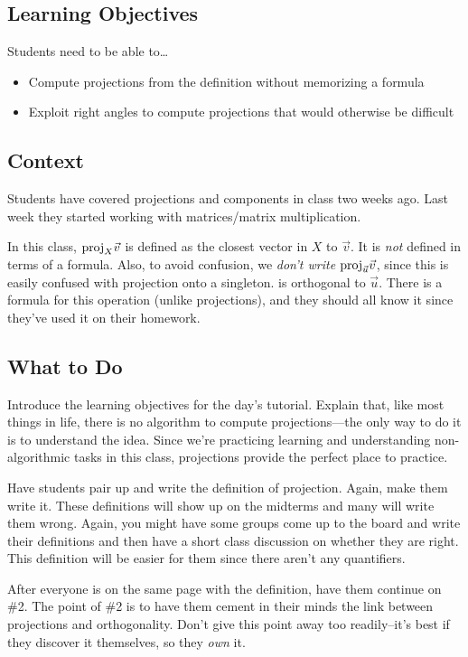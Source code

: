 \subsection*{Learning Objectives}
	Students need to be able to\ldots
	\begin{itemize}
		\item Compute projections from the definition without memorizing a formula
		\item Exploit right angles to compute projections that would otherwise be
			difficult
	\end{itemize}

\subsection*{Context}
	Students have covered projections and components in class two weeks ago. Last week they started
		working with matrices/matrix multiplication.

	In this class, $\mathrm{proj}_X\vec v$ is defined as the closest vector in $X$ to $\vec v$. It is \emph{not}
		defined in terms of a formula. Also, to avoid confusion, we \emph{don't write}
		$\mathrm{proj}_{\vec u}\vec v$, since this is easily confused with projection onto a singleton.
		is orthogonal to $\vec u$. There is a formula for this operation (unlike projections), and they
		should all know it since they've used it on their homework.

\subsection*{What to Do}
	Introduce the learning objectives for the day's tutorial. Explain that, like most things in life,
		there is no algorithm to compute projections---the only way to do it is to understand
		the idea. Since we're practicing learning and understanding non-algorithmic tasks in this
		class, projections provide the perfect place to practice.

	Have students pair up and write the definition of projection. Again, make them
		write it. These definitions will show up on the midterms and many will
		write them wrong. Again, you might have some groups come up to the board and
		write their definitions and then have a short class discussion on whether they are right.
		This definition will be easier for them since there aren't any quantifiers.

		After everyone is on the same page with the definition, have them continue on \#2.
		The point of \#2 is to have them cement in their minds the link between projections
		and orthogonality. Don't give this point away too readily--it's best if they discover it themselves, so
		they \emph{own} it.

